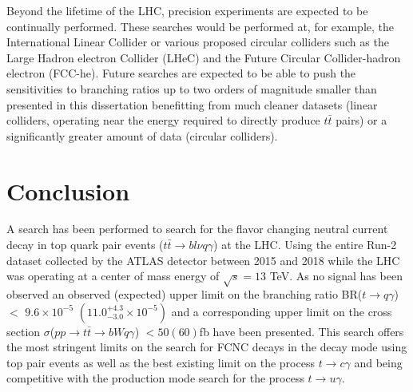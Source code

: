 Beyond the lifetime of the LHC, precision experiments are expected to be continually performed.  These searches would be performed at, for example, the International Linear Collider \cite{Buesser:2013pza} or various proposed circular colliders such as the Large Hadron electron Collider (LHeC) and the Future Circular Collider-hadron electron (FCC-he)\cite{Benedikt:2015kqj}.  Future searches are expected to be able to push the sensitivities to branching ratios up to two orders of magnitude smaller than presented in this dissertation\cite{Cakir:2018ruj} benefitting from much cleaner datasets (linear colliders, operating near the energy required to directly produce $t\bar{t}$ pairs) or a significantly greater amount of data (circular colliders).

\section{Conclusion}

A search has been performed to search for the flavor changing neutral current decay in top quark pair events ($t\bar{t}\rightarrow bl\nu q \gamma$) at the LHC.  Using the entire Run-2 dataset collected by the ATLAS detector between 2015 and 2018 while the LHC was operating at a center of mass energy of $\sqrt{s}=13$ TeV.  As no signal has been observed an observed (expected) upper limit on the branching ratio BR($t\rightarrow q \gamma$)$<$ $9.6\times10^{-5}$ $(11.0^{+4 .3}_{-3.0}\times10^{-5})$ and a corresponding upper limit on the cross section $\sigma$($pp\rightarrow t\bar{t} \rightarrow bWq\gamma$) $< 50 (60)$fb have been presented.  This search offers the most stringent limits on the search for FCNC decays in the decay mode using top pair events as well as the best existing limit on the process $t\rightarrow c \gamma$ and being competitive with the production mode search for the process $t\rightarrow u \gamma$.

%
